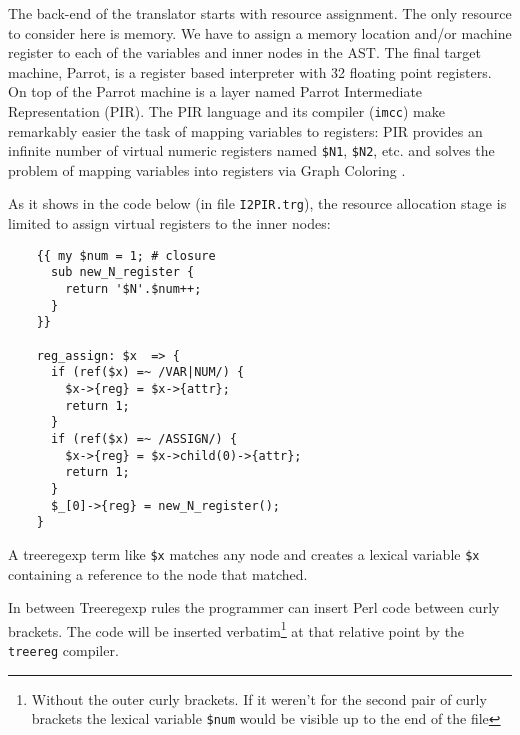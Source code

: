 The back-end of the translator starts with resource assignment.
The only resource to consider here is memory. We have to assign
a memory location and/or machine register to each of the variables and inner nodes
in the AST. The final target machine, Parrot, is a register based 
interpreter with 32 floating point registers. On top of the Parrot
machine is a layer named Parrot Intermediate Representation (PIR).
The PIR language and its compiler (\verb|imcc|) make remarkably easier 
the task of mapping variables to registers:
PIR provides an infinite number of virtual
numeric registers named \verb|$N1|, \verb|$N2|, etc. and solves
the problem of mapping variables into registers via Graph Coloring
\cite{briggs98register}.

As it shows in the code below (in file \verb|I2PIR.trg|), 
the resource allocation stage
is limited to assign virtual registers
to the inner nodes:

\begin{verbatim}
    {{ my $num = 1; # closure
      sub new_N_register {
        return '$N'.$num++;
      }
    }}

    reg_assign: $x  => {
      if (ref($x) =~ /VAR|NUM/) {
        $x->{reg} = $x->{attr};
        return 1;
      }
      if (ref($x) =~ /ASSIGN/) {
        $x->{reg} = $x->child(0)->{attr};
        return 1;
      }
      $_[0]->{reg} = new_N_register();
    }
\end{verbatim}

A treeregexp term like \verb|$x| matches any node
and creates a lexical variable \verb|$x|
containing a reference to the node that matched.

In between Treeregexp rules the programmer can insert 
Perl code between curly brackets. 
The code will be inserted verbatim\footnote{Without 
the outer curly brackets.
If it weren't for the second pair of curly brackets
the lexical variable {\tt \$num} would be visible
up to the end of the file
} at that relative point by the \verb|treereg|
compiler. 

